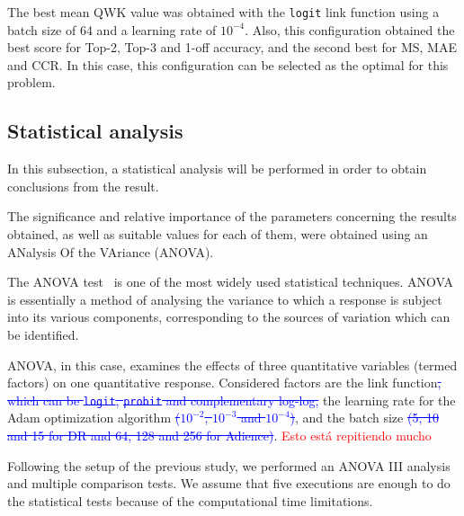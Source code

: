 \documentclass[journal]{IEEEtran}
\begin{document}
	The best mean QWK value was obtained with the \texttt{logit} link function using a batch size of 64 and a learning rate of $10^{-4}$. Also, this configuration obtained the best score for Top-2, Top-3 and 1-off accuracy, and the second best for MS, MAE and CCR. In this case, this configuration can be selected as the optimal for this problem.
	
	\subsection{Statistical analysis}
	\label{sect:statisticalanalysis}
	In this subsection, a statistical analysis will be performed in order to obtain conclusions from the result.
	
	The significance and relative importance of the parameters concerning the results obtained, as well as suitable values for each of them, were obtained using an ANalysis Of the VAriance (ANOVA).
	
	The ANOVA test~\cite{miller1997beyond} is one of the most widely used statistical techniques. ANOVA is essentially a method of analysing the variance to which a response is subject into its various components, corresponding to the sources of variation which can be identified.
	
	ANOVA, in this case, examines the effects of three quantitative variables (termed factors) on one quantitative response. Considered factors are the link function\textcolor{blue}{\sout{, which can be \texttt{logit}, \texttt{probit} and complementary log-log,}} the learning rate for the Adam optimization algorithm \textcolor{blue}{\sout{($10^{-2}$, $10^{-3}$ and $10^{-4}$)}}, and the batch size \textcolor{blue}{\sout{(5, 10 and 15 for DR and 64, 128 and 256 for Adience)}}. \textcolor{red}{Esto está repitiendo mucho}
	
	Following the setup of the previous study, we performed an ANOVA III analysis and multiple comparison tests. We assume that five executions are enough to do the statistical tests because of the computational time limitations.
	
	
\end{document}

